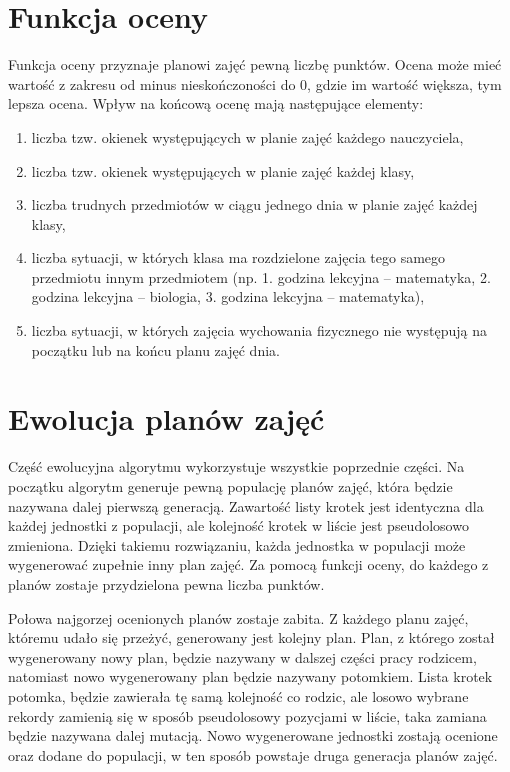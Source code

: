\section{Funkcja oceny}

    Funkcja oceny przyznaje planowi zajęć pewną liczbę punktów. Ocena może mieć wartość z zakresu od minus nieskończoności do 0, gdzie im wartość większa, tym lepsza ocena.
    Wpływ na końcową ocenę mają następujące elementy:
\begin{enumerate}
	\item liczba tzw. okienek występujących w planie zajęć każdego nauczyciela,
	\item liczba tzw. okienek występujących w planie zajęć każdej klasy,
	\item liczba trudnych przedmiotów w ciągu jednego dnia w planie zajęć każdej klasy,
	\item liczba sytuacji, w których klasa ma rozdzielone zajęcia tego samego przedmiotu innym przedmiotem (np. 1. godzina lekcyjna -- matematyka, 2. godzina lekcyjna -- biologia, 3. godzina lekcyjna -- matematyka),
	\item liczba sytuacji, w których zajęcia wychowania fizycznego nie występują na początku lub na końcu planu zajęć dnia.
\end{enumerate}


\section{Ewolucja planów zajęć}

    Część ewolucyjna algorytmu wykorzystuje wszystkie poprzednie części. Na początku algorytm generuje pewną populację planów zajęć, która będzie nazywana dalej pierwszą generacją. Zawartość listy krotek jest identyczna dla każdej jednostki z populacji, ale kolejność krotek w liście jest pseudolosowo zmieniona. Dzięki takiemu rozwiązaniu, każda jednostka w populacji może wygenerować zupełnie inny plan zajęć. Za pomocą funkcji oceny, do każdego z planów zostaje przydzielona pewna liczba punktów. 

Połowa najgorzej ocenionych planów zostaje zabita. Z każdego planu zajęć, któremu udało się przeżyć, generowany jest kolejny plan. Plan, z którego został wygenerowany nowy plan, będzie nazywany w dalszej części pracy rodzicem, natomiast nowo wygenerowany plan będzie nazywany potomkiem. Lista krotek potomka, będzie zawierała tę samą kolejność co rodzic, ale losowo wybrane rekordy zamienią się w sposób pseudolosowy pozycjami w liście, taka zamiana będzie nazywana dalej mutacją. Nowo wygenerowane jednostki zostają ocenione oraz dodane do populacji, w ten sposób powstaje druga generacja planów zajęć.

